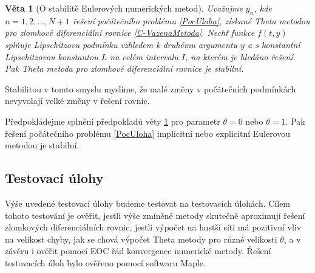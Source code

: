 \documentclass[a4paper,12pt,twoside]{article}
\newtheorem{veta}{Věta}[section]
\theoremstyle{definition}
\theoremstyle{remark}
\numberwithin{equation}{section}
\numberwithin{table}{section}
\numberwithin{figure}{section}
\begin{document}
\begin{veta} [O stabilitě Eulerových numerických metod] \label{StabilityOfEuler}
	Uvažujme $y_{n}$, kde $n = 1,2,...,N+1$ řešení počátečního problému \eqref{PocUloha}, získané Theta metodou pro zlomkové diferenciální rovnice \eqref{C-VazenaMetoda}. Nechť funkce $f\left(t,y\right)$ splňuje Lipschitzovu podmínku vzhledem k druhému argumentu $y$ a s konstantní Lipschitzovou konstantou $L$ na celém intervalu $I$, na kterém je hledáno řešení. Pak Theta metoda pro zlomkové diferenciální rovnice je stabilní.
\end{veta}
Stabilitou v tomto smyslu myslíme, že  malé změny v počátečních podmínkách nevyvolají velké změny v řešení rovnic.

Předpokládejme splnění předpokladů věty \ref{StabilityOfEuler} pro parametr $\theta = 0$ nebo $\theta = 1$. Pak řešení počátečního problému \eqref{PocUloha} implicitní nebo explicitní Eulerovou metodou je stabilní.



\subsection{Testovací úlohy}
Výše uvedené testovací úlohy budeme testovat na testovacích úlohách. Cílem tohoto testování je ověřit, jestli výše zmíněné metody skutečně aproximují řešení zlomkových diferenciálních rovnic, jestli výpočet na hustší síti má pozitivní vliv na velikost chyby, jak se chová výpočet Theta metody pro různé velikosti $\theta$, a v závěru i ověřit pomocí EOC řád konvergence numerické metody.
Řešení testovacích úloh bylo ověřeno pomocí softwaru Maple. 
\end{document}
